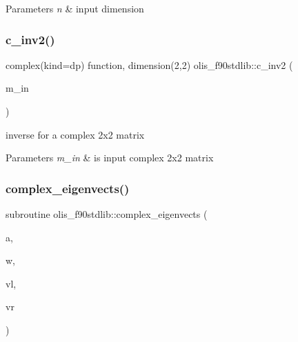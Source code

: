 \begin{DoxyParams}{Parameters}
{\em n} & input dimension \\
\hline
\end{DoxyParams}
\mbox{\label{namespaceolis__f90stdlib_a162dd5131a39a62d7b95e2ebca4664a4}} 
\subsubsection{\texorpdfstring{c\+\_\+inv2()}{c\_inv2()}}
{\footnotesize\ttfamily complex(kind=dp) function, dimension(2,2) olis\+\_\+f90stdlib\+::c\+\_\+inv2 (\begin{DoxyParamCaption}\item[{complex(kind=dp), dimension(2,2), intent(in)}]{m\+\_\+in }\end{DoxyParamCaption})}



inverse for a complex 2x2 matrix 


\begin{DoxyParams}{Parameters}
{\em m\+\_\+in} & is input complex 2x2 matrix \\
\hline
\end{DoxyParams}
\mbox{\label{namespaceolis__f90stdlib_a71c5b363b52932a5c69053149ac8cc25}} 
\subsubsection{\texorpdfstring{complex\+\_\+eigenvects()}{complex\_eigenvects()}}
{\footnotesize\ttfamily subroutine olis\+\_\+f90stdlib\+::complex\+\_\+eigenvects (\begin{DoxyParamCaption}\item[{complex(kind=dp), dimension(\+:,\+:), allocatable}]{a,  }\item[{complex(kind=dp), dimension(\+:), allocatable}]{w,  }\item[{complex(kind=dp), dimension(\+:,\+:), allocatable}]{vl,  }\item[{complex(kind=dp), dimension(\+:,\+:), allocatable}]{vr }\end{DoxyParamCaption})}



